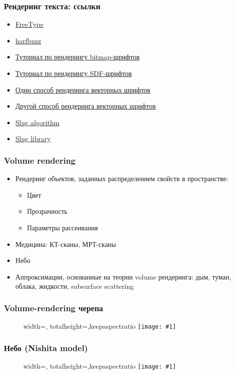 \documentclass{beamer}
\newcommand{\slideimage}[1]{
  \begin{figure}
    \begin{adjustbox}{width=\textwidth, totalheight=\textheight-2\baselineskip-2\baselineskip,keepaspectratio}
      \texttt{[image: \#1]}
    \end{adjustbox}
  \end{figure}
}
\begin{document}
\begin{frame}[fragile]
\frametitle{Рендеринг текста: ссылки}
\begin{itemize}
\item \href{https://freetype.org}{FreeType}
\item \href{https://harfbuzz.github.io}{harfbuzz}
\item \href{https://learnopengl.com/In-Practice/Text-Rendering}{Туториал по рендерингу bitmap-шрифтов}
\item \href{https://blog.mapbox.com/drawing-text-with-signed-distance-fields-in-mapbox-gl-b0933af6f817}{Туториал по рендерингу SDF-шрифтов}
\item \href{https://wdobbie.com/post/gpu-text-rendering-with-vector-textures}{Один способ рендеринга векторных шрифтов}
\item \href{https://medium.com/@evanwallace/easy-scalable-text-rendering-on-the-gpu-c3f4d782c5ac}{Другой способ рендеринга векторных шрифтов}
\item \href{https://jcgt.org/published/0006/02/02}{Slug algorithm}
\item \href{https://sluglibrary.com}{Slug library}
\end{itemize}
\end{frame}

\begin{frame}[fragile]
\frametitle{Volume rendering}
\begin{itemize}
\item Рендеринг объектов, заданных распределением свойств в пространстве:
\pause
\begin{itemize}
\item Цвет
\item Прозрачность
\item Параметры рассеивания
\end{itemize}
\pause
\item Медицина: КТ-сканы, МРТ-сканы
\item Небо
\item Аппроксимации, основанные на теории volume рендеринга: дым, туман, облака, жидкости, subsurface scattering
\end{itemize}
\end{frame}

\begin{frame}[fragile]
\frametitle{Volume-rendering черепа}
\slideimage{volume-skull.png}
\end{frame}

\begin{frame}[fragile]
\frametitle{Небо (Nishita model)}
\slideimage{sky.jpg}
\end{frame}
\end{document}
